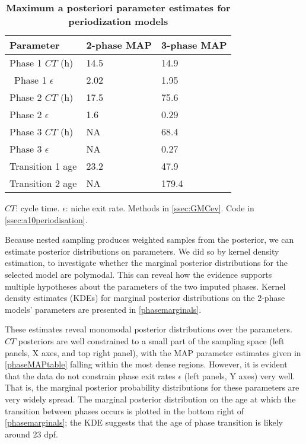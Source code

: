 \begin{table}[!ht]
    \centering
    \caption{{\bf Maximum a posteriori parameter estimates for periodization models}}
    \begin{tabular}{|l|l|l|}
        \hline
        {\bf Parameter} & {\bf 2-phase MAP} & {\bf 3-phase MAP}\\ \hline
        Phase 1 $CT$ (h) & 14.5 & 14.9\\ \hline\
        Phase 1 $\epsilon$ & 2.02 & 1.95\\ \hline
        Phase 2 $CT$ (h) & 17.5 & 75.6\\ \hline
        Phase 2 $\epsilon$ & 1.6 & 0.29\\ \hline
        Phase 3 $CT$ (h) & NA & 68.4\\ \hline
        Phase 3 $\epsilon$ & NA & 0.27\\ \hline
        Transition 1 age & 23.2 & 47.9\\ \hline
        Transition 2 age & NA & 179.4\\ \hline
    \end{tabular}
    \begin{flushleft}
        $CT$: cycle time.
        $\epsilon$: niche exit rate.
        Methods in \autoref{ssec:GMCev}.
        Code in \autoref{ssec:a10periodisation}.    
    \end{flushleft}
    \label{phaseMAPtable}
\end{table}

Because nested sampling produces weighted samples from the posterior, we can estimate posterior distributions on parameters. We did so by kernel density estimation, to investigate whether the marginal posterior distributions for the selected model are polymodal. This can reveal how the evidence supports multiple hypotheses about the parameters of the two imputed phases. Kernel density estimates (KDEs) for marginal posterior distributions on the 2-phase models' parameters are presented in \autoref{phasemarginals}. 

These estimates reveal monomodal posterior distributions over the parameters. $CT$ posteriors are well constrained to a small part of the sampling space (left panels, X axes, and top right panel), with the MAP parameter estimates given in \autoref{phaseMAPtable} falling within the most dense regions. However, it is evident that the data do not constrain phase exit rates $\epsilon$ (left panels, Y axes) very well. That is, the marginal posterior probability distributions for these parameters are very widely spread.  The marginal posterior distribution on the age at which the transition between phases occurs is plotted in the bottom right of \autoref{phasemarginals}; the KDE suggests that the age of phase transition is likely around 23 dpf.

